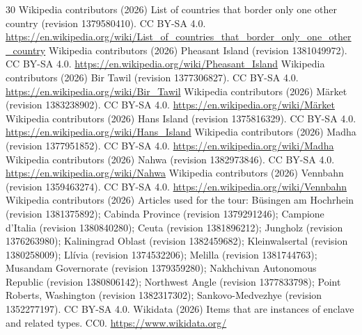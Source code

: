 \documentclass[11pt,a4paper]{article}
\begin{document}
\begin{thebibliography}{30}
 Wikipedia contributors (2026) List of countries that border only one other country (revision 1379580410). CC BY-SA 4.0. \url{https://en.wikipedia.org/wiki/List_of_countries_that_border_only_one_other_country}
 Wikipedia contributors (2026) Pheasant Island (revision 1381049972). CC BY-SA 4.0. \url{https://en.wikipedia.org/wiki/Pheasant_Island}
 Wikipedia contributors (2026) Bir Tawil (revision 1377306827). CC BY-SA 4.0. \url{https://en.wikipedia.org/wiki/Bir_Tawil}
 Wikipedia contributors (2026) Märket (revision 1383238902). CC BY-SA 4.0. \url{https://en.wikipedia.org/wiki/Märket}
 Wikipedia contributors (2026) Hans Island (revision 1375816329). CC BY-SA 4.0. \url{https://en.wikipedia.org/wiki/Hans_Island}
 Wikipedia contributors (2026) Madha (revision 1377951852). CC BY-SA 4.0. \url{https://en.wikipedia.org/wiki/Madha}
 Wikipedia contributors (2026) Nahwa (revision 1382973846). CC BY-SA 4.0. \url{https://en.wikipedia.org/wiki/Nahwa}
 Wikipedia contributors (2026) Vennbahn (revision 1359463274). CC BY-SA 4.0. \url{https://en.wikipedia.org/wiki/Vennbahn}
 Wikipedia contributors (2026) Articles used for the tour: Büsingen am Hochrhein (revision 1381375892); Cabinda Province (revision 1379291246); Campione d'Italia (revision 1380840280); Ceuta (revision 1381896212); Jungholz (revision 1376263980); Kaliningrad Oblast (revision 1382459682); Kleinwalsertal (revision 1380258009); Llívia (revision 1374532206); Melilla (revision 1381744763); Musandam Governorate (revision 1379359280); Nakhchivan Autonomous Republic (revision 1380806142); Northwest Angle (revision 1377833798); Point Roberts, Washington (revision 1382317302); Sankovo-Medvezhye (revision 1352277197). CC BY-SA 4.0.
 Wikidata (2026) Items that are instances of enclave and related types. CC0. \url{https://www.wikidata.org/}
\end{thebibliography}
\end{document}

